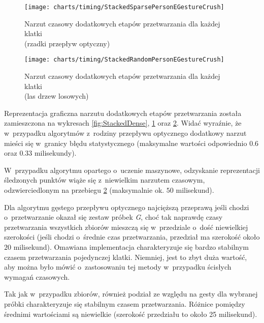     \begin{figure}[!ht]
      \centering
      \texttt{[image: charts/timing/StackedSparsePersonEGestureCrush]}
      \caption[Narzut czasowy dodatkowych etapów przetwarzania dla każdej klatki\\(rzadki przepływ optyczny)]
              {Narzut czasowy dodatkowych etapów przetwarzania dla każdej klatki\\(rzadki przepływ optyczny)}
      \label{fig:StackedSparse}
    \end{figure}

    \newpage
    \begin{figure}[!ht]
      \centering
      \texttt{[image: charts/timing/StackedRandomPersonEGestureCrush]}
      \caption[Narzut czasowy dodatkowych etapów przetwarzania dla każdej klatki\\(las drzew losowych)]
              {Narzut czasowy dodatkowych etapów przetwarzania dla każdej klatki\\(las drzew losowych)}
      \label{fig:StackedRandom}
    \end{figure}

    Reprezentacja graficzna narzutu dodatkowych etapów przetwarzania została zamieszczona na wykresach \ref{fig:StackedDense}, \ref{fig:StackedSparse} oraz \ref{fig:StackedRandom}. Widać wyraźnie, że w~przypadku algorytmów z~rodziny przepływu optycznego dodatkowy narzut mieści się w~granicy błędu statystycznego (maksymalne wartości odpowiednio $0.6$ oraz $0.33$ milisekundy).

    W~przypadku algorytmu opartego o~uczenie maszynowe, odzyskanie reprezentacji śledzonych punktów wiąże się z~niewielkim narzutem czasowym, odzwierciedlonym na przebiegu \ref{fig:StackedRandom} (maksymalnie ok. $50$ milisekund).

    Dla algorytmu gęstego przepływu optycznego najcięższą przeprawą jeśli chodzi o~przetwarzanie okazał się zestaw próbek \textit{G}, choć tak naprawdę czasy przetwarzania wszystkich zbiorów mieszczą się w~przedziale o~dość niewielkiej szerokości (jeśli chodzi o~średnie czas przetwarzania, przedział ma szerokość około $20$ milisekund). Omawiana implementacja charakteryzuje się bardzo stabilnym czasem przetwarzania pojedynczej klatki. Niemniej, jest to zbyt duża wartość, aby można było mówić o~zastosowaniu tej metody w~przypadku ścisłych wymagań czasowych.

    Tak jak w~przypadku zbiorów, również podział ze względu na gesty dla wybranej próbki charakteryzuje się stabilnym czasem przetwarzania. Różnice pomiędzy średnimi wartościami są niewielkie (szerokość przedziału to około 25 milisekund).

